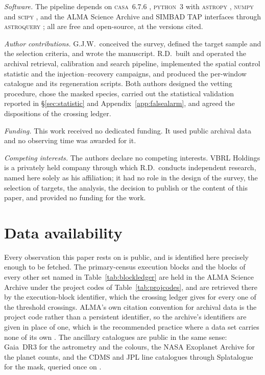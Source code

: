 \emph{Software.} The pipeline depends on \textsc{casa}~6.7.6
\citep{CASA2022}, \textsc{python}~3 with \textsc{astropy} \citep{Astropy2022}, \textsc{numpy}
\citep{Harris2020} and \textsc{scipy} \citep{Virtanen2020}, and the ALMA Science
Archive and SIMBAD TAP interfaces through \textsc{astroquery} \citep{Ginsburg2019};
all are free and open-source, at the versions cited.

\emph{Author contributions.} G.J.W.\ conceived the survey, defined the target sample and the selection
criteria, and wrote the manuscript. R.D.\ built and operated the archival
retrieval, calibration and search pipeline, implemented the spatial control
statistic and the injection--recovery campaigns, and produced the per-window
catalogue and its regeneration scripts. Both authors designed the vetting
procedure, chose the masked species, carried out the statistical
validation reported in \S\ref{sec:statistic} and
Appendix~\ref{app:falsealarm}, and agreed the dispositions of
the crossing ledger.

\emph{Funding.} This work received no dedicated funding. It used public archival data and
no observing time was awarded for it.

\emph{Competing interests.} The authors declare no competing interests. VBRL Holdings is a privately
held company through which R.D.\ conducts independent research, named
here solely as his affiliation; it had no role in the design of the
survey, the selection of targets, the analysis, the decision to publish
or the content of this paper, and provided no funding for the work.

\section*{Data availability}
\label{sec:data}
Every observation this paper rests on is public, and is identified here
precisely enough to be fetched. The \NEB{} primary-census execution blocks and
the blocks of every other set named in Table~\ref{tab:blockledger} are held in
the ALMA Science Archive under the \NProjCodes{} project codes of
Table~\ref{tab:projcodes}, and are retrieved there by the execution-block
identifier, which the crossing ledger gives for every one of the
\EvNCrossRaw{} threshold crossings. ALMA's own citation
convention for archival data is the project code rather than a persistent
identifier, so the archive's identifiers are given in place of one, which is
the recommended practice where a data set carries none of its own
\citep{Chen2022}. The
ancillary catalogues are public in the same sense: Gaia~DR3 for the astrometry
and the colours, the NASA Exoplanet Archive for the planet counts, and the
CDMS and JPL line catalogues through Splatalogue for the mask, queried once on
\McQueryDate.

